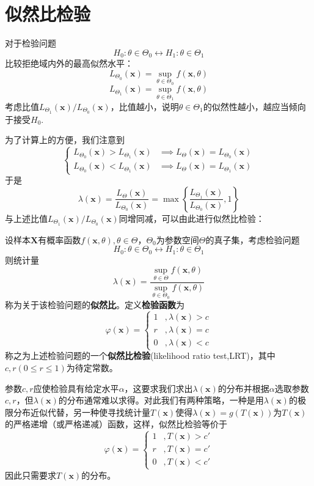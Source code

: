 \documentclass{ctexbook}
\begin{document}
\section{似然比检验}

对于检验问题
$$H_0:\theta\in\Theta_0\leftrightarrow H_1:\theta\in\Theta_1$$
比较拒绝域内外的最高似然水平：
$$L_{\Theta_0}(\mathbf{x})=\sup_{\theta\in\Theta_0}f(\mathbf{x},\theta)$$
$$L_{\Theta_1}(\mathbf{x})=\sup_{\theta\in\Theta_1}f(\mathbf{x},\theta)$$
考虑比值$L_{\Theta_1}(\mathbf{x})/L_{\Theta_0}(\mathbf{x})$，比值越小，说明$\theta\in\Theta_1$的似然性越小，越应当倾向于接受$H_0$.

为了计算上的方便，我们注意到
$$\begin{cases}
    L_{\Theta_0}(\mathbf{x})>L_{\Theta_1}(\mathbf{x})&\implies L_{\Theta}(\mathbf{x})=L_{\Theta_0}(\mathbf{x})\\
    L_{\Theta_0}(\mathbf{x})<L_{\Theta_1}(\mathbf{x})&\implies L_{\Theta}(\mathbf{x})=L_{\Theta_1}(\mathbf{x})
\end{cases}$$
于是
$$\lambda(\mathbf{x})=\frac{L_{\Theta}(\mathbf{x})}{L_{\Theta_0}(\mathbf{x})}=\max\left\{\frac{L_{\Theta_1}(\mathbf{x})}{L_{\Theta_0}(\mathbf{x})},1\right\}$$
与上述比值$L_{\Theta_1}(\mathbf{x})/L_{\Theta_0}(\mathbf{x})$同增同减，可以由此进行似然比检验：

\begin{definition}[似然比检验]
    设样本$\mathbf{X}$有概率函数$f(\mathbf{x},\theta),\theta\in\Theta$，$\Theta_0$为参数空间$\Theta$的真子集，考虑检验问题
    $$H_0:\theta\in\Theta_0\leftrightarrow H_1:\theta\in\Theta_1$$
    则统计量
    $$\lambda(\mathbf{x})=\frac{\sup_{\theta\in\Theta}f(\mathbf{x},\theta)}{\sup_{\theta\in\Theta_0}f(\mathbf{x},\theta)}$$
    称为关于该检验问题的\textbf{似然比}。定义\textbf{检验函数}为
    $$\varphi(\mathbf{x})=\begin{cases}
        1&,\lambda(\mathbf{x})>c\\
        r&,\lambda(\mathbf{x})=c\\
        0&,\lambda(\mathbf{x})<c
    \end{cases}$$
    称之为上述检验问题的一个\textbf{似然比检验}(likelihood ratio test,LRT)，其中$c,r(0\le r\le 1)$为待定常数。
\end{definition}

参数$c,r$应使检验具有给定水平$\alpha$，这要求我们求出$\lambda(\mathbf{x})$的分布并根据$\alpha$选取参数$c,r$，但$\lambda(\mathbf{x})$的分布通常难以求得。对此我们有两种策略，一种是用$\lambda(\mathbf{x})$的极限分布近似代替，另一种使寻找统计量$T(\mathbf{x})$使得$\lambda(\mathbf{x})=g(T(\mathbf{x}))$为$T(\mathbf{x})$的严格递增（或严格递减）函数，这样，似然比检验等价于
$$\varphi(\mathbf{x})=\begin{cases}
        1&,T(\mathbf{x})>c'\\
        r&,T(\mathbf{x})=c'\\
        0&,T(\mathbf{x})<c'
    \end{cases}$$
因此只需要求$T(\mathbf{x})$的分布。
\end{document}
